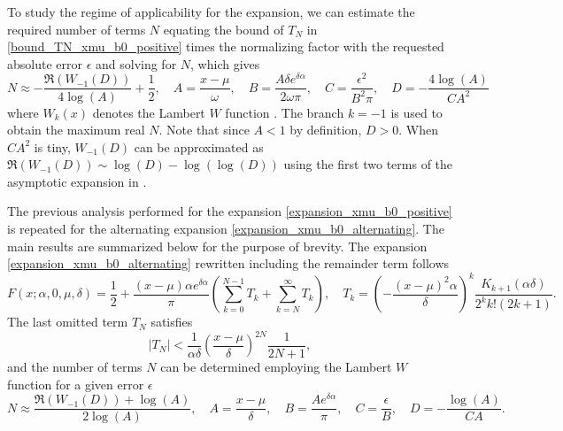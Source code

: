 \documentclass[10pt,a4paper,oneside]{article}
\numberwithin{equation}{section}
\begin{document}
To study the regime of applicability for the expansion, we can estimate the required number of terms $N$ equating the bound of $T_N$ in \eqref{bound_TN_xmu_b0_positive} times the normalizing factor with the requested absolute error $\epsilon$ and solving for $N$, which gives
\begin{equation}\label{N_expansion_xmu_b0_positive}
N \approx -\frac{\Re(W_{-1}(D))}{4 \log(A)} + \frac{1}{2}, \quad A = \frac{x-\mu}{\omega}, \quad B = \frac{A\delta e^{\delta \alpha}}{2\omega\pi}, \quad C = \frac{\epsilon^2}{B^2 \pi}, \quad D = -\frac{4 \log(A)}{C A^2}
\end{equation}
where $W_k(x)$ denotes the Lambert $W$ function \cite[\S 4.13]{NIST:DLMF}. The branch $k=-1$ is used to obtain the maximum real $N$. Note that since $A < 1$ by definition, $D > 0$. When $C A^2$ is tiny, $W_{-1}(D)$ can be approximated as $\Re(W_{-1}(D)) \sim \log(D) - \log(\log(D))$ using the first two terms of the asymptotic expansion in \cite[\S 4.13.10]{NIST:DLMF}.

The previous analysis performed for the expansion \eqref{expansion_xmu_b0_positive} is repeated for the alternating expansion \eqref{expansion_xmu_b0_alternating}. The main results are summarized below for the purpose of brevity. The expansion \eqref{expansion_xmu_b0_alternating} rewritten including the remainder term follows
\begin{equation}
F(x; \alpha, 0, \mu, \delta) = \frac{1}{2} + \frac{(x-\mu)\alpha e^{\delta \alpha}}{\pi} \left( \sum_{k=0}^{N-1} T_k + \sum_{k=N}^{\infty}T_k\right),  \quad T_k = \left(-\frac{(x-\mu)^2 \alpha}{\delta}\right)^k \frac{K_{k+1}(\alpha \delta)}{2^k k! (2k + 1)}.
\end{equation}
The last omitted term $T_N$ satisfies
\begin{equation}
|T_N| < \frac{1}{\alpha \delta} \left(\frac{x-\mu}{\delta}\right)^{2N} \frac{1}{2N + 1},
\end{equation} 
and the number of terms $N$ can be determined employing the Lambert $W$ function for a given error $\epsilon$
\begin{equation}
N \approx \frac{\Re(W_{-1}(D)) + \log(A)}{2 \log(A)}, \quad A = \frac{x-\mu}{\delta}, \quad B = \frac{A e^{\delta \alpha}}{\pi}, \quad C = \frac{\epsilon}{B}, \quad D = -\frac{\log(A)}{CA}.
\end{equation}
\end{document}
